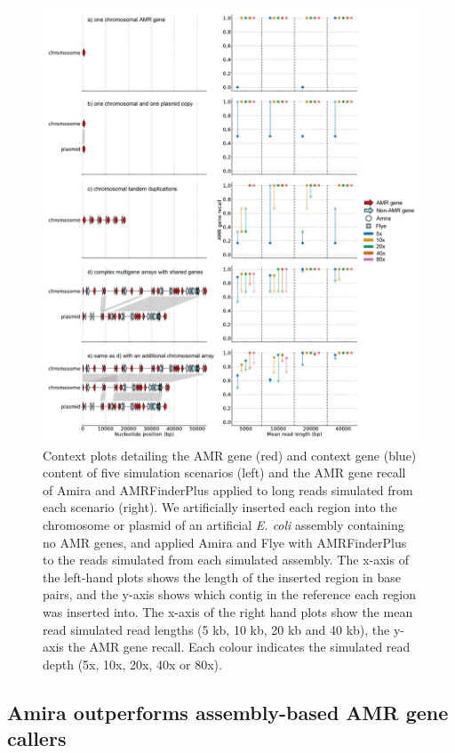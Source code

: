 \begin{figure}
\centering
\includegraphics[width=1\linewidth]{Figures/figure_2.pdf}
\caption{Context plots detailing the AMR gene (red) and context gene (blue) content of five simulation scenarios (left) and the AMR gene recall of Amira and AMRFinderPlus applied to long reads simulated from each scenario (right). We artificially inserted each region into the chromosome or plasmid of an artificial \textit{E. coli} assembly containing no AMR genes, and applied Amira and Flye with AMRFinderPlus to the reads simulated from each simulated assembly. The x-axis of the left-hand plots shows the length of the inserted region in base pairs, and the y-axis shows which contig in the reference each region was inserted into. The x-axis of the right hand plots show the mean read simulated read lengths (5 kb, 10 kb, 20 kb and 40 kb), the y-axis the AMR gene recall. Each colour indicates the simulated read depth (5x, 10x, 20x, 40x or 80x).}
\label{fig:2}
\end{figure}

\subsection*{Amira outperforms assembly-based AMR gene callers}

